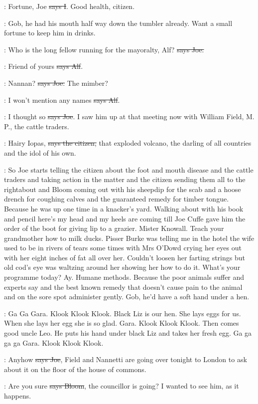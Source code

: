 :
Fortune, Joe \sout{says I}. Good health, citizen.

\Nq:
Gob, he had his mouth half way down the tumbler already. Want a
small fortune to keep him in drinks.

\joe:
Who is the long fellow running for the mayoralty,
Alf? \sout{says Joe.}

\bergan:
Friend of yours \sout{says Alf}.

\joe:
Nannan? \sout{says Joe.} The mimber?

\bergan:
I won't mention any names \sout{says Alf}.

\joe:
I thought so \sout{says Joe}.
I saw him up at that meeting now with William
Field, M. P., the cattle traders.

\citizen:
Hairy Iopas, \sout{says the citizen,}
that exploded volcano, the darling of all
countries and the idol of his own.

\Nq:
So Joe starts telling the citizen about the foot and mouth disease and
the cattle traders and taking action in the matter and the citizen sending
them all to the rightabout and Bloom coming out with his sheepdip for the
scab and a hoose drench for coughing calves and the guaranteed remedy
for timber tongue. Because he was up one time in a knacker's yard.
Walking about with his book and pencil here's my head and my heels are
coming till Joe Cuffe gave him the order of the boot for giving lip to a
grazier. Mister Knowall. Teach your grandmother how to milk ducks.
Pisser Burke was telling me in the hotel the wife used to be in rivers of
tears some times with Mrs O'Dowd crying her eyes out with her eight inches
of fat all over her. Couldn't loosen her farting strings but old cod's eye
was waltzing around her showing her how to do it. What's your programme
today? Ay. Humane methods. Because the poor animals suffer and experts
say and the best known remedy that doesn't cause pain to the animal and
on the sore spot administer gently. Gob, he'd have a soft hand under a
hen.

:
Ga Ga Gara. Klook Klook Klook. Black Liz is our hen. She lays eggs
for us. When she lays her egg she is so glad. Gara. Klook Klook Klook.
Then comes good uncle Leo. He puts his hand under black Liz and takes
her fresh egg. Ga ga ga ga Gara. Klook Klook Klook.

\joe:
Anyhow \sout{says Joe},
Field and Nannetti are going over tonight to London
to ask about it on the floor of the house of commons.

\Bloom:
Are you sure \sout{says Bloom},
the councillor is going? I wanted to see him,
as it happens.

